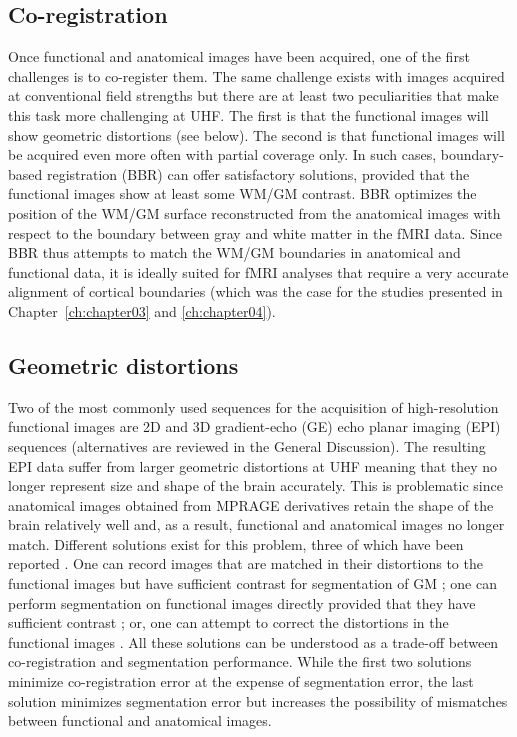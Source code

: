 \subsection{Co-registration}
Once functional and anatomical images have been acquired, one of the first challenges is to co-register them. The same challenge exists with images acquired at conventional field strengths but there are at least two peculiarities that make this task more challenging at UHF. The first is that the functional images will show geometric distortions (see below). The second is that functional images will be acquired even more often with partial coverage only. In such cases, boundary-based registration (BBR) \parencite{Greve2009} can offer satisfactory solutions, provided that the functional images show at least some WM/GM contrast. BBR optimizes the position of the WM/GM surface reconstructed from the anatomical images with respect to the boundary between gray and white matter in the fMRI data. Since BBR thus attempts to match the WM/GM boundaries in anatomical and functional data, it is ideally suited for fMRI analyses that require a very accurate alignment of cortical boundaries \parencite{Polimeni2017} (which was the case for the studies presented in Chapter~\ref{ch:chapter03} and \ref{ch:chapter04}).

\subsection{Geometric distortions}
Two of the most commonly used sequences for the acquisition of high-resolution functional images are 2D \parencite{Feinberg2010, Moeller2010, Setsompop2012} and 3D \parencite{Poser2010} gradient-echo (GE) echo planar imaging (EPI) sequences (alternatives are reviewed in the General Discussion). The resulting EPI data suffer from larger geometric distortions at UHF meaning that they no longer represent size and shape of the brain accurately. This is problematic since anatomical images obtained from MPRAGE derivatives retain the shape of the brain relatively well and, as a result, functional and anatomical images no longer match. Different solutions exist for this problem, three of which have been reported \parencite{DeMartino2016}. One can record images that are matched in their distortions to the functional images but have sufficient contrast for segmentation of GM \parencite{Renvall2016, Kashyap2017}; one can perform segmentation on functional images directly provided that they have sufficient contrast \parencite{Fracasso2016}; or, one can attempt to correct the distortions in the functional images \parencite{Emmerling2016, Marquardt2018}. All these solutions can be understood as a trade-off between co-registration and segmentation performance. While the first two solutions minimize co-registration error at the expense of segmentation error, the last solution minimizes segmentation error but increases the possibility of mismatches between functional and anatomical images.

